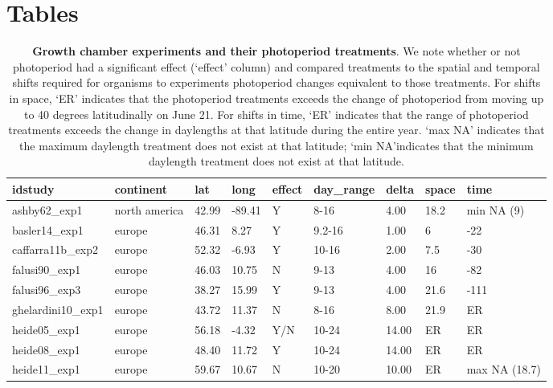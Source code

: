 \documentclass{article}
\begin{document}

\clearpage


\section* {Tables}
\begin{table}[ht]
\centering
\caption{\textbf{Growth chamber experiments and their photoperiod treatments}. We note whether or not photoperiod had a significant effect (`effect' column) and compared treatments to the spatial and temporal shifts required for organisms to experiments photoperiod changes equivalent to those treatments. For shifts in space, `ER' indicates that the photoperiod treatments exceeds the change of photoperiod from moving up to 40 degrees latitudinally on June 21. For shifts in time, `ER' indicates that the range of photoperiod treatments exceeds the change in daylengths at that latitude during the entire year. `max NA' indicates that the maximum daylength treatment does not exist at that latitude; `min NA'indicates that the minimum daylength treatment does not exist at that latitude.} 
\label{table:phototreats}
\begin{tabular}{|p{}|p{}|p{}|p{}|p{}|p{}|p{}|p{}|p{}|}
  \hline
idstudy & continent & lat & long & effect & day\_range & delta & space & time \\ 
  \hline
ashby62\_exp1 & north america & 42.99 & -89.41 & Y & 8-16 & 4.00 & 18.2 & min NA (9) \\ 
  basler14\_exp1 & europe & 46.31 & 8.27 & Y & 9.2-16 & 1.00 & 6 & -22 \\ 
  caffarra11b\_exp2 & europe & 52.32 & -6.93 & Y & 10-16 & 2.00 & 7.5 & -30 \\ 
  falusi90\_exp1 & europe & 46.03 & 10.75 & N & 9-13 & 4.00 & 16 & -82 \\ 
  falusi96\_exp3 & europe & 38.27 & 15.99 & Y & 9-13 & 4.00 & 21.6 & -111 \\ 
  ghelardini10\_exp1 & europe & 43.72 & 11.37 & N & 8-16 & 8.00 & 21.9 & ER \\ 
  heide05\_exp1 & europe & 56.18 & -4.32 & Y/N & 10-24 & 14.00 & ER & ER \\ 
  heide08\_exp1 & europe & 48.40 & 11.72 & Y & 10-24 & 14.00 & ER & ER \\ 
  heide11\_exp1 & europe & 59.67 & 10.67 & N & 10-20 & 10.00 & ER & max NA (18.7) \\ 

\end{tabular}
\end{table}
\end{document}
